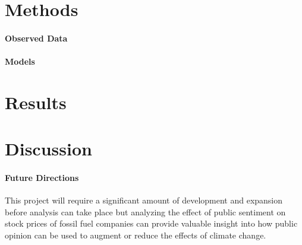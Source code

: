 \documentclass[12pt]{article}
\begin{document}
\section{Methods}

\paragraph{Observed Data}

\paragraph{Models}

\section{Results}

\section{Discussion}

\paragraph{Future Directions}
This project will require a significant amount of development and expansion before analysis can take place but analyzing the effect of public sentiment on stock prices of fossil fuel companies can provide valuable insight into how public opinion can be used to augment or reduce the effects of climate change.


%
%
\end{document}
